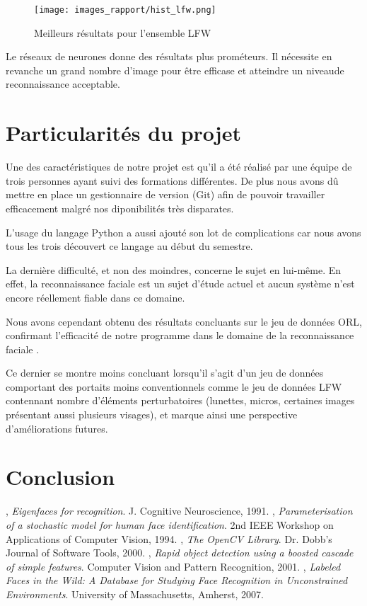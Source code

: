 \documentclass[a4paper,10pt,twocolumn]{extarticle}
\begin{document}
\begin{figure}[H]
  \begin{center}
    \texttt{[image: images\_rapport/hist\_lfw.png]}
    \caption{Meilleurs résultats pour l'ensemble LFW}
    \label{fig:results_lfw}
  \end{center}
\end{figure}
Le réseaux de neurones donne des résultats plus prométeurs. Il nécessite en revanche un grand nombre d'image pour être efficase et atteindre un niveaude reconnaissance acceptable.

\section{Particularités du projet}
Une des caractéristiques de notre projet est qu'il a été réalisé par une équipe de trois personnes ayant suivi des formations différentes. De plus nous avons dû mettre en place un gestionnaire de version (Git) afin de pouvoir travailler efficacement malgré nos diponibilités très disparates.

L'usage du langage Python a aussi ajouté son lot de complications car nous avons tous les trois découvert ce langage au début du semestre.

La dernière difficulté, et non des moindres, concerne le sujet en lui-même. En effet, la reconnaissance faciale est un sujet d'étude actuel et aucun système n'est encore réellement fiable dans ce domaine.

Nous avons cependant obtenu des résultats concluants sur le jeu de données ORL, confirmant l'efficacité de notre programme dans le domaine de la reconnaissance faciale .

Ce dernier se montre moins concluant lorsqu'il s'agit d'un jeu de données comportant des portaits moins conventionnels comme le jeu de données LFW contennant nombre d'éléments perturbatoires (lunettes, micros, certaines images présentant aussi plusieurs visages), et marque ainsi une perspective d'améliorations futures.


\section{Conclusion}


\begin{thebibliography}{9}
  , 
  \emph{Eigenfaces for recognition}.
  J. Cognitive Neuroscience,
  1991. 
  , 
  \emph{Parameterisation of a stochastic model for human face identification}.
  2nd IEEE Workshop on Applications of Computer Vision,
  1994.
  , 
  \emph{The OpenCV Library}.
  Dr. Dobb's Journal of Software Tools,
  2000.
  , 
  \emph{Rapid object detection using a boosted cascade of simple features}.
  Computer Vision and Pattern Recognition,
  2001.
  , 
  \emph{Labeled Faces in the Wild: A Database for Studying Face Recognition in Unconstrained Environments}.
  University of Massachusetts, Amherst,
  2007.

\end{thebibliography}
\end{document}
